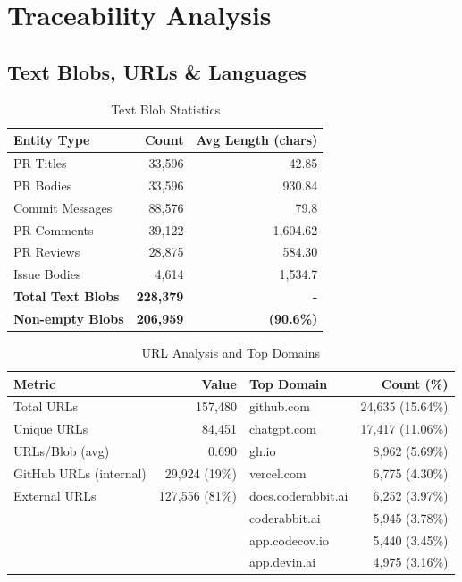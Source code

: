 \documentclass[11pt]{article}
\begin{document}
\section{Traceability Analysis}

\subsection{Text Blobs, URLs \& Languages}

\begin{table}[H]
\centering
\caption{Text Blob Statistics}
\label{tab:text_blobs}
\begin{tabular}{@{}lrr@{}}
\toprule
\textbf{Entity Type} & \textbf{Count} & \textbf{Avg Length (chars)} \\
\midrule
PR Titles & 33,596 & 42.85 \\
PR Bodies & 33,596 & 930.84 \\
Commit Messages & 88,576 & 79.8 \\
PR Comments & 39,122 & 1,604.62 \\
PR Reviews & 28,875 & 584.30 \\
Issue Bodies & 4,614 & 1,534.7 \\
\midrule
\textbf{Total Text Blobs} & \textbf{228,379} & \textbf{-} \\
\textbf{Non-empty Blobs} & \textbf{206,959} & \textbf{(90.6\%)} \\
\bottomrule
\end{tabular}
\end{table}

\begin{table}[H]
\centering
\caption{URL Analysis and Top Domains}
\small
\begin{tabular}{@{}lr|lr@{}}
\toprule
\textbf{Metric} & \textbf{Value} & \textbf{Top Domain} & \textbf{Count (\%)} \\
\midrule
Total URLs & 157,480 & github.com & 24,635 (15.64\%) \\
Unique URLs & 84,451 & chatgpt.com & 17,417 (11.06\%) \\
URLs/Blob (avg) & 0.690 & gh.io & 8,962 (5.69\%) \\
GitHub URLs (internal) & 29,924 (19\%) & vercel.com & 6,775 (4.30\%) \\
External URLs & 127,556 (81\%) & docs.coderabbit.ai & 6,252 (3.97\%) \\
 &  & coderabbit.ai & 5,945 (3.78\%) \\
 &  & app.codecov.io & 5,440 (3.45\%) \\
 &  & app.devin.ai & 4,975 (3.16\%) \\
\bottomrule
\end{tabular}
\end{table}
\end{document}
